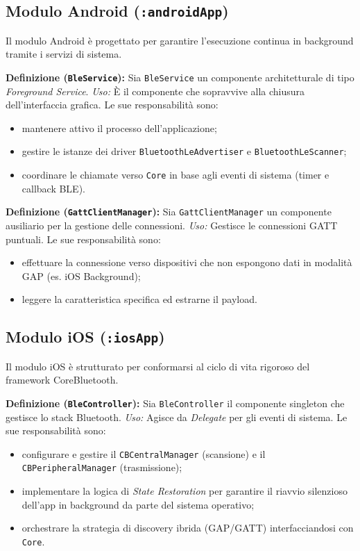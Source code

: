 \documentclass[a4paper,11pt,table,dvipsnames]{article}
\begin{document}
\subsection{Modulo Android (\texttt{:androidApp})}
Il modulo Android è progettato per garantire l'esecuzione continua in background tramite i servizi di sistema.

\textbf{Definizione (\texttt{BleService}):}
Sia \texttt{BleService} un componente architetturale di tipo \emph{Foreground Service}.
\emph{Uso:} È il componente che sopravvive alla chiusura dell'interfaccia grafica. Le sue responsabilità sono:
\begin{itemize}
    \item mantenere attivo il processo dell'applicazione;
    \item gestire le istanze dei driver \texttt{BluetoothLeAdvertiser} e \texttt{BluetoothLeScanner};
    \item coordinare le chiamate verso \texttt{Core} in base agli eventi di sistema (timer e callback BLE).
\end{itemize}

\textbf{Definizione (\texttt{GattClientManager}):}
Sia \texttt{GattClientManager} un componente ausiliario per la gestione delle connessioni.
\emph{Uso:} Gestisce le connessioni GATT puntuali. Le sue responsabilità sono:
\begin{itemize}
    \item effettuare la connessione verso dispositivi che non espongono dati in modalità GAP (es. iOS Background);
    \item leggere la caratteristica specifica ed estrarne il payload.
\end{itemize}

\subsection{Modulo iOS (\texttt{:iosApp})}
Il modulo iOS è strutturato per conformarsi al ciclo di vita rigoroso del framework CoreBluetooth.

\textbf{Definizione (\texttt{BleController}):}
Sia \texttt{BleController} il componente singleton che gestisce lo stack Bluetooth.
\emph{Uso:} Agisce da \emph{Delegate} per gli eventi di sistema. Le sue responsabilità sono:
\begin{itemize}
    \item configurare e gestire il \texttt{CBCentralManager} (scansione) e il \texttt{CBPeripheralManager} (trasmissione);
    \item implementare la logica di \emph{State Restoration} per garantire il riavvio silenzioso dell'app in background da parte del sistema operativo;
    \item orchestrare la strategia di discovery ibrida (GAP/GATT) interfacciandosi con \texttt{Core}.
\end{itemize}
\end{document}
